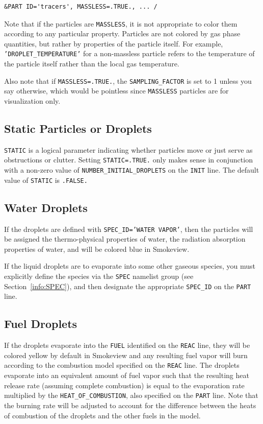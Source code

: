 \documentclass[11pt]{book}
\newcommand{\ct}{\tt\small}
\begin{document}
\footnotesize
\begin{verbatim}
&PART ID='tracers', MASSLESS=.TRUE., ... /
\end{verbatim}
\normalsize

\noindent
Note that if the particles are {\ct MASSLESS}, it is not appropriate to color them according to any particular property.
Particles are not colored by gas phase quantities, but rather by properties of the particle itself. For example,
{\ct 'DROPLET\_TEMPERATURE'} for a non-massless particle refers to the temperature of the particle itself
rather than the local gas temperature.

Also note that if {\ct MASSLESS=.TRUE.}, the {\ct SAMPLING\_FACTOR} is set to 1 unless you say otherwise, which would be pointless
since {\ct MASSLESS} particles are for visualization only.


\subsection{Static Particles or Droplets}
\label{info:STATIC}

{\ct STATIC} is a logical parameter indicating whether particles move or just serve
as obstructions or clutter. Setting {\ct STATIC=.TRUE.} only makes sense in conjunction with a non-zero value of
{\ct NUMBER\_INITIAL\_DROPLETS} on the {\ct INIT} line. The default value of {\ct STATIC} is {\ct .FALSE.}


\subsection{Water Droplets}

If the droplets are defined with {\ct SPEC\_ID='WATER VAPOR'}, then the particles will be assigned the thermo-physical properties of water,
the radiation absorption properties of water, and will be colored blue in Smokeview.

If the liquid droplets are to evaporate into some other gaseous species, you must explicitly define the species via the {\ct SPEC} namelist group (see Section~\ref{info:SPEC}), and then
designate the appropriate {\ct SPEC\_ID} on the {\ct PART} line.

\subsection{Fuel Droplets}
\label{info:fuel_droplets}

If the droplets evaporate into the {\ct FUEL} identified on the {\ct REAC} line, they will be colored yellow by default in Smokeview and any resulting
fuel vapor will burn according to the combustion model specified on the {\ct REAC} line.
The droplets evaporate into an equivalent amount of fuel vapor such that the resulting heat release rate
(assuming complete combustion) is equal to the evaporation rate multiplied by the {\ct HEAT\_OF\_COMBUSTION}, also specified on the {\ct PART} line. Note that the
burning rate will be adjusted to account for the difference between the heats of combustion of the droplets and the other fuels in the model.
\end{document}

